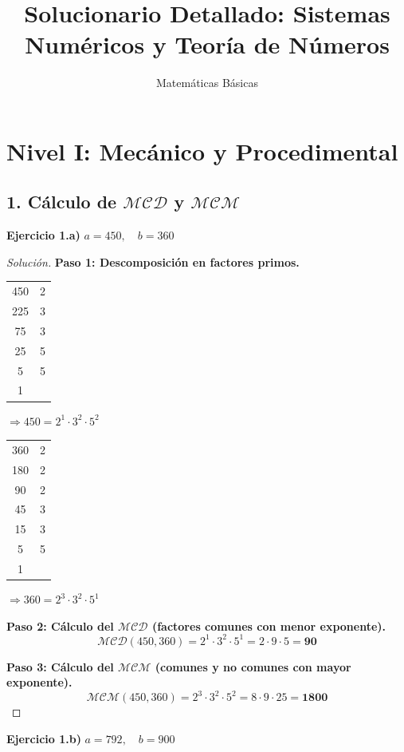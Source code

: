 \documentclass[12pt, letterpaper]{article}
\title{Solucionario Detallado: Sistemas Numéricos y Teoría de Números}
\author{Matemáticas Básicas}
\date{}
\newenvironment{solucion}
    {\begin{proof}[Solución]}
    {\end{proof}}
\begin{document}
\maketitle

\section*{Nivel I: Mecánico y Procedimental}

\subsection*{1. Cálculo de $\mathcal{MCD}$ y $\mathcal{MCM}$}

\textbf{Ejercicio 1.a)} $a = 450, \quad b = 360$

\begin{solucion}
    \textbf{Paso 1: Descomposición en factores primos.}
    \begin{center}
    \begin{tabular}{c|c} 
        450 & 2 \\ 225 & 3 \\ 75 & 3 \\ 25 & 5 \\ 5 & 5 \\ 1 & 
    \end{tabular} \quad $\Rightarrow 450 = 2^1 \cdot 3^2 \cdot 5^2$
    \hspace{1cm}
    \begin{tabular}{c|c} 
        360 & 2 \\ 180 & 2 \\ 90 & 2 \\ 45 & 3 \\ 15 & 3 \\ 5 & 5 \\ 1 & 
    \end{tabular} \quad $\Rightarrow 360 = 2^3 \cdot 3^2 \cdot 5^1$
    \end{center}

    \textbf{Paso 2: Cálculo del $\mathcal{MCD}$ (factores comunes con menor exponente).}
    \[ \mathcal{MCD}(450, 360) = 2^1 \cdot 3^2 \cdot 5^1 = 2 \cdot 9 \cdot 5 = \mathbf{90} \]

    \textbf{Paso 3: Cálculo del $\mathcal{MCM}$ (comunes y no comunes con mayor exponente).}
    \[ \mathcal{MCM}(450, 360) = 2^3 \cdot 3^2 \cdot 5^2 = 8 \cdot 9 \cdot 25 = \mathbf{1800} \]
\end{solucion}

\textbf{Ejercicio 1.b)} $a = 792, \quad b = 900$
\end{document}
